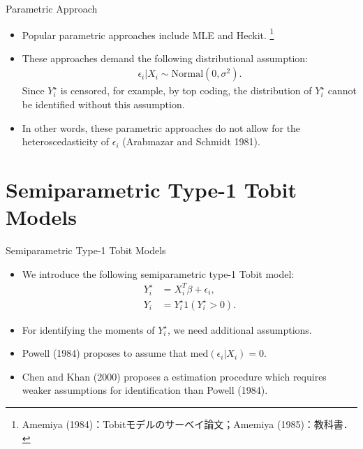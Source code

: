 \documentclass[xcolor=svgnames,dvipdfmx,cjk]{beamer}
\theoremstyle{example}
\def\med{\text{med}}
\begin{document}
\begin{frame}{Parametric Approach}
      \begin{itemize}
            \item Popular parametric approaches include MLE and Heckit.
                  \footnote{Amemiya (1984)：Tobitモデルのサーベイ論文；Amemiya (1985)：教科書．}  
            \item These approaches demand the following distributional assumption:
                  \begin{align*}
                        \epsilon_i | X_i \sim \text{Normal}(0, \sigma^2).
                  \end{align*}
                  Since $Y_i^{\star}$ is censored, for example, by top coding, 
                  the distribution of $Y_i^{\star}$ cannot be identified 
                  without this assumption.
            \item In other words, these parametric approaches do not allow for the heteroscedasticity of $\epsilon_i$
                  (Arabmazar and Schmidt 1981).
      \end{itemize}  
\end{frame}

\section{Semiparametric Type-1 Tobit Models}

\begin{frame}{Semiparametric Type-1 Tobit Models}
      \begin{itemize}
            \item We introduce the following semiparametric type-1 Tobit model:
                  \begin{align*}
                        Y_i^{\star} &= X_i^T \beta + \epsilon_i, \\
                        Y_i         &=  Y_i^{\star} 1( Y_i^{\star} > 0).
                  \end{align*}
            \item For identifying the moments of $Y_i^{\star}$, 
                  we need additional assumptions.
            \item Powell (1984) proposes to assume that 
                  $\med(\epsilon_i|X_i) = 0$.
            \item Chen and Khan (2000) proposes a estimation procedure 
                  which requires weaker assumptions for identification than Powell (1984).
      \end{itemize}
\end{frame}
\end{document}

